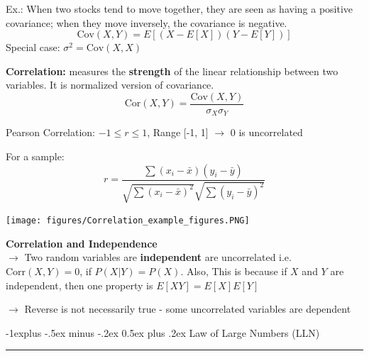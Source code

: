 \documentclass[letterpaper, 10.5pt,landscape]{article}
\makeatletter
\renewcommand{\subsection}{\@startsection{subsection}{2}{0mm}%
                                {-1explus -.5ex minus -.2ex}%
                                {0.5ex plus .2ex}%
                                {\normalfont\normalsize\bfseries}}
\makeatother
\begin{document}
\begin{multicols*}{3}
Ex.: When two stocks tend to move together, they are seen as having a positive covariance; when they move inversely, the covariance is negative.
\vspace{-5pt}
\[\boxed{\text{Cov}(X,Y) = E \left[\left(X - E[X] \right)  \left( Y- E[Y]  \right)   \right]} \]
\vspace{-3pt}
Special case: \(\boxed{\sigma^{2} = \text{Cov}(X, X)  }\) 

\vspace{5pt}

\textbf{Correlation:} measures the \textbf{strength} of the linear relationship between two variables. It is normalized version of covariance.
\vspace{-3pt}
\[\boxed{\text{Cor}(X, Y) = \frac{\text{Cov}(X,Y)}{\sigma_{X} \sigma_{Y}}} \]

Pearson Correlation: $-1 \leq r \leq 1$, Range [-1, 1] $\rightarrow$ 0 is uncorrelated


For a sample: 
\vspace{-5pt}
\[\boxed{r = \frac{\sum(x_{i} - \bar{x}) (y_{i} - \bar{y})}{\sqrt{\sum (x_{i} - \bar{x})^{2}} \sqrt{\sum(y_{i} - \bar{y})^{2}}}} \]



\begin{minipage}{\linewidth}
    \centering
    \texttt{[image: figures/Correlation\_example\_figures.PNG]}
\end{minipage}

\textbf{Correlation and Independence} \\
$\rightarrow$ Two random variables are \textbf{independent} are uncorrelated i.e. \(\boxed{\text{Corr}(X, Y) = 0} \), if $P(X|Y) = P(X)$. Also, This is because if $X$
 and $Y$ are independent, then one property is \(E[XY] = E[X]E[Y]\)


$\rightarrow$ Reverse is not necessarily true - some uncorrelated variables are dependent





\subsection{Law of Large Numbers (LLN)} {\color{teal}\hrule height 0.5pt} \smallskip


\end{multicols*}
\end{document}
